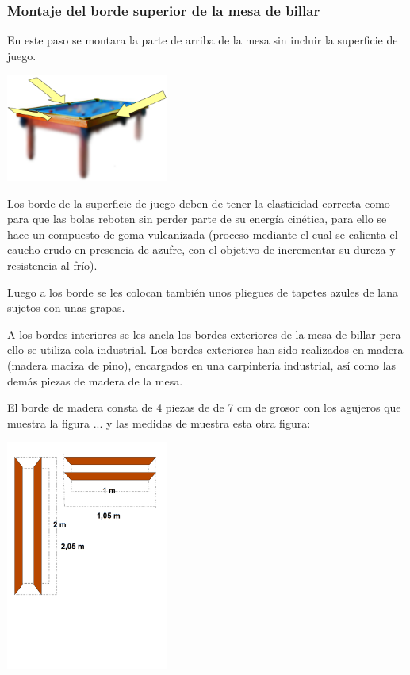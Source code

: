 		\subsubsection {Montaje del  borde superior de la mesa de billar}

	En este paso se montara la parte de arriba de la mesa  sin incluir la superficie de juego.

	\begin{center}
    		\includegraphics[width=0.4\textwidth]{P1.png}
	\end{center}
	
	Los borde de la superficie de juego deben de tener la elasticidad correcta como para que las bolas reboten sin perder parte de su energía cinética, para ello se hace un compuesto de goma vulcanizada (proceso mediante el cual se calienta el caucho crudo en presencia de azufre, con el objetivo de incrementar su dureza y resistencia al frío).

Luego a los borde se les colocan también unos pliegues de tapetes azules de lana sujetos con unas grapas.


A los bordes interiores se les ancla los bordes exteriores de la mesa de billar pera ello se utiliza cola industrial. Los bordes exteriores han sido realizados en madera (madera maciza de pino), encargados en una carpintería industrial, así como las demás piezas de  madera de la mesa.  

El borde de madera consta de 4 piezas de de 7 cm de grosor con los agujeros que muestra la figura ... y las medidas de muestra esta otra figura:

\begin{center}
    		\includegraphics[width=0.4\textwidth]{Exterior.png}
	\end{center}

